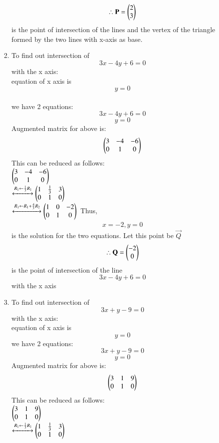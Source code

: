 \documentclass[journal,12pt,twocolumn]{IEEEtran}
\renewcommand\thesection{\arabic{section}}
\begin{document}
\begin{enumerate}[label=\thesection.\arabic*.,ref=\thesection.\theenumi]
\begin{enumerate}
\begin{align}
\therefore \mathbf{P}=\begin{pmatrix}2\\3\end{pmatrix}
\end{align}
is the point of intersection of the lines and the vertex of the triangle formed by the two lines with x-axis as base.
\item To find out intersection of \[3x-4y+6=0\] with the x axis:\\
    equation of x axis is \[y=0\]
    \\we have 2 equations: \[3x-4y+6=0\] \[y=0\]
    Augmented matrix for above is:
\begin{align}
    \begin{pmatrix}3 & -4 & -6\\
           0 & 1 & 0\end{pmatrix}
\end{align}
This can be reduced as follows:\\
$\begin{pmatrix}3 & -4 & -6\\
           0 & 1 & 0\end{pmatrix}$\\
    $\xleftrightarrow {R_1 \leftarrow \frac{1}{3}R_1}
    \begin{pmatrix}1 & \frac{1}{3} & 3\\
          0 & 1 & 0\end{pmatrix}\\$\\
          $\xleftrightarrow{R_1 \leftarrow R_1 + \frac{4}{3}R_2}
    \begin{pmatrix}1 &0&-2\\
        0&1&0\end{pmatrix}\\$
Thus,
\begin{align}
    x=-2, y=0
\end{align} 
is the solution for the two equations. 
Let this point be $\vec{Q}$
\begin{align}
\therefore \mathbf{Q}=\begin{pmatrix}-2\\0\end{pmatrix}
\end{align}
is the point of intersection of the line \[3x-4y+6=0\] with the x axis
\item To find out intersection of \[3x+y-9=0\] with the x axis:\\
    equation of x axis is \[y=0\]
    we have 2 equations: \[3x+y-9=0\] \[y=0\]
    Augmented matrix for above is:
\begin{align}
    \begin{pmatrix}3 & 1 & 9\\
           0 & 1 & 0\end{pmatrix}
\end{align}
This can be reduced as follows:\\
$\begin{pmatrix}3 & 1 & 9\\
           0 & 1 & 0\end{pmatrix}$\\
    $\xleftrightarrow {R_1 \leftarrow \frac{1}{3}R_1}
    \begin{pmatrix}1 & \frac{1}{3} & 3\\
          0 & 1 & 0\end{pmatrix}\\$\\

\end{enumerate}
\end{enumerate}
\end{document}
